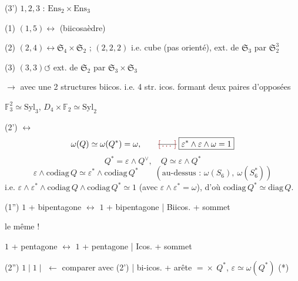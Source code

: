 \documentclass[11pt,a4paper]{article}
\begin{document}


(3') $1, 2, 3$ :  $\mathrm{Ens}_2 \times \mathrm{Ens}_3$ \struck{\ill{}}

(1) $(1, 5) \longleftrightarrow$ (biicosaèdre)

(2) $(2, 4) \leftrightarrow \mathfrak{S}_4 \times \mathfrak{S}_2$ ; $(2, 2, 2)$ i.e. cube (pas \struck{\ill{}} orienté), ext. de $\mathfrak{S}_3$ par $\mathfrak{S}_2^3$

(3) $(3, 3) \circlearrowleft$ ext. de $\mathfrak{S}_2$ par $\mathfrak{S}_3 \times \mathfrak{S}_3$

\quad $\longrightarrow$ avec une 2 structures biicos. i.e. 4 str. icos. formant deux paires d'opposées


$\mathbb{F}_3^2 \simeq \mathrm{Syl}_3$, \quad $D_4 \times \mathbb{F}_2 \simeq \mathrm{Syl}_2$

(2')  $\longleftrightarrow$ 
\[
  \omega(Q) \simeq \omega(Q^*) = \omega, \qquad \text{\struck{\ill{}}}\; \boxed{\varepsilon^* \wedge \varepsilon \wedge \omega = 1}
\]
\[
  \boxed{Q^* = \varepsilon \wedge Q^\vee,\quad Q \simeq \varepsilon \wedge Q^*}
\]
\[
  \varepsilon \wedge \mathrm{codiag}\, Q \simeq \varepsilon^* \wedge \mathrm{codiag}\, Q^*
  \qquad (\text{au-dessus : } \omega(S_6),\ \omega(S_6^*))
\]
i.e. $\varepsilon \wedge \varepsilon^* \wedge \mathrm{codiag}\, Q \wedge \mathrm{codiag}\, Q^* \simeq 1$ (avec $\varepsilon \wedge \varepsilon^* = \omega$), d'où $\mathrm{codiag}\, Q^* \simeq \mathrm{diag}\, Q$.

(1'') $1$ + bipentagone $\longleftrightarrow$ $1$ + bipentagone \quad | Biicos. + sommet

\quad le même !

\quad $1$ + pentagone $\longleftrightarrow$ $1$ + pentagone \quad | Icos. + sommet

(2'') $1 \mid 1 \mid$  $\longleftarrow$ comparer avec (2') \quad | bi-icos. + arête $= \boxed{\times}\ Q^*$, $\varepsilon \simeq \omega(Q^*)$ (*)
\end{document}
